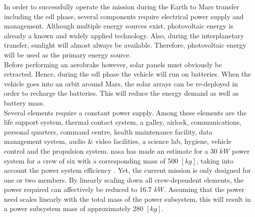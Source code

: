 In order to successfully operate the mission during the Earth to Mars transfer including the \gls{edl} phase, several components require electrical power supply and management. Although multiple  energy sources exist, photovoltaic energy is already a known and widely applied technology. Also, during the interplanetary transfer, sunlight will almost always be available. Therefore, photovoltaic energy will be used as the primary energy source.\\
 
Before performing an aerobrake however, solar panels must obviously be retracted. Hence, during the \gls{edl} phase the vehicle will run on batteries. When the vehicle goes into an orbit around Mars, the solar arrays can be re-deployed in order to recharge the batteries. This will reduce the energy demand as well as battery mass.\\

Several elements require a constant power supply. Among these elements are the life support system, thermal contact system, a galley, airlock, communications, personal quarters, command centre, health maintenance facility, data management system, audio \& video facilities, a science lab, hygiene, vehicle control and the propulsion system. \gls{nasa} has made an estimate for a $30$ $kW$ power system for a crew of six with a corresponding mass of 500 $\left[kg\right]$, taking into account the power system efficiency \cite{Hoffman1997a}. Yet, the current mission is only designed for one or two members. By linearly scaling down all crew-dependent elements, the power required can affectively be reduced to $16.7$ $kW$. Assuming that the power need scales linearly with the total mass of the power subsystem, this will result in a power subsystem mass of approximately $280$ $\left[kg\right]$.\\
